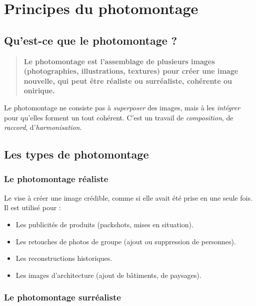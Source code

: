 \section{Principes du photomontage}

\subsection{Qu'est-ce que le photomontage ?}

\begin{quote}
\textbf{Le photomontage est l'assemblage de plusieurs images (photographies, illustrations, textures) pour créer une image nouvelle, qui peut être réaliste ou surréaliste, cohérente ou onirique.}
\end{quote}

Le photomontage ne consiste pas à \emph{superposer} des images, mais à les \emph{intégrer} pour qu'elles forment un tout cohérent. C'est un travail de \emph{composition}, de \emph{raccord}, d'\emph{harmonisation}.

\subsection{Les types de photomontage}

\subsubsection{Le photomontage réaliste}

Le  vise à créer une image crédible, comme si elle avait été prise en une seule fois. Il est utilisé pour :

\begin{itemize}
    \item Les publicités de produits (packshots, mises en situation).
    \item Les retouches de photos de groupe (ajout ou suppression de personnes).
    \item Les reconstructions historiques.
    \item Les images d'architecture (ajout de bâtiments, de paysages).
\end{itemize}

\subsubsection{Le photomontage surréaliste}

